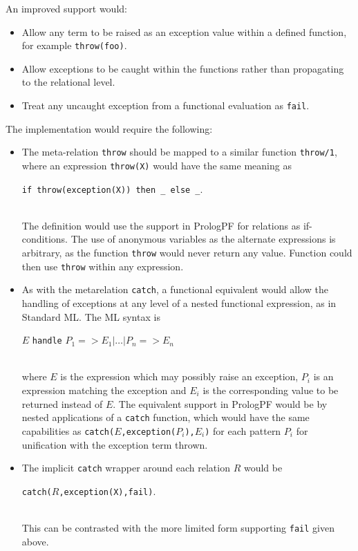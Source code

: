 An improved support would:
\begin{itemize}
\item{Allow any term to be raised as an exception value within a
  defined function, for example \texttt{throw(foo)}.}
\item{Allow exceptions to be caught within the functions rather than
  propagating to the relational level.}
\item{Treat any uncaught exception from a functional evaluation as
  \texttt{fail}.}
\end{itemize}
The implementation would require the following:
\begin{itemize}
\item{The meta-relation \texttt{throw} should be mapped to a
  similar function \texttt{throw/1}, 
  where an expression \texttt{throw(X)}
  would have the same meaning as\\
  \centerline{\texttt{if throw(exception(X)) then \_{} else \_{}}.}\\
  The
  definition would use the support in PrologPF for relations
  as if-conditions.  The use of anonymous variables as
  the alternate expressions is arbitrary, as the function
  \texttt{throw} would never return any value.
  Function could then use \texttt{throw}
  within any expression.}
\item{As with the metarelation \texttt{catch}, a functional
  equivalent would allow the handling of exceptions at any
  level of a nested functional expression, as in Standard
  ML.  The ML syntax is\\
  \centerline{$E$ \texttt{handle} $P_1 => E_1 | \ldots | P_n => E_n$}\\
  where $E$ is the expression which may possibly raise an
  exception, $P_i$ is an expression matching the exception and
  $E_i$ is the corresponding
  value to be returned instead of $E$.  The equivalent support
  in PrologPF would be by nested applications of a
  \texttt{catch} function, which would have the same capabilities as
  \texttt{catch(}$E$\texttt{,exception(}$P_i$\texttt{),}$E_i$\texttt{)} for
  each pattern $P_i$ for unification with the exception term thrown.
  }
\item{The implicit \texttt{catch} wrapper around each relation $R$
  would be\\
  \centerline{\texttt{catch(}$R$\texttt{,exception(X),fail)}.}\\
  This can
  be contrasted with the more limited form supporting \texttt{fail}
  given above.
  }
\end{itemize}


